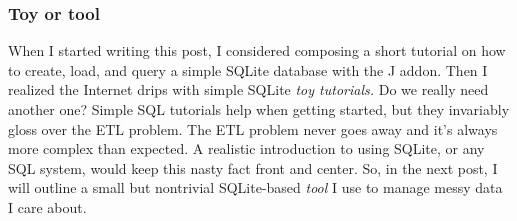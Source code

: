 \subsubsection{Toy or tool}%

When I started writing this post, I considered composing a short
tutorial on how to create, load, and query a simple SQLite database with
the J addon. Then I realized the Internet drips with simple SQLite
\emph{toy tutorials.} Do we really need another one? Simple SQL
tutorials help when getting started, but they invariably gloss over the
ETL problem. The ETL problem never goes away and it's always more
complex than expected. A realistic introduction to using SQLite, or any
SQL system, would keep this nasty fact front and center. So, in the next
post, I will outline a small but nontrivial SQLite-based \emph{tool} I
use to manage messy data I care about.


%
 

